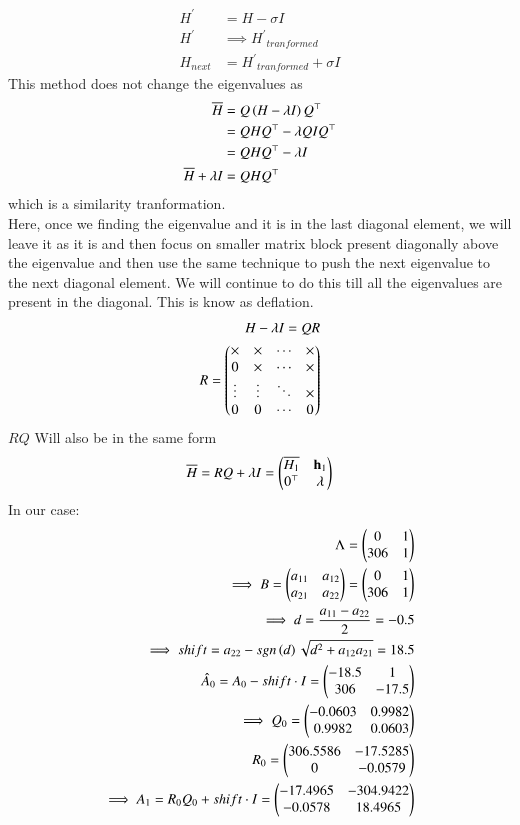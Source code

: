 \documentclass[journal]{IEEEtran}
\begin{document}
\begin{align}
	H^\prime &= H - \sigma I\\
	H^\prime &\implies {H^\prime}_{tranformed}\\
	H_{next} &= {H^\prime}_{tranformed} + \sigma I
\end{align}
This method does not change the eigenvalues as
\begin{align}
\overline{H} &= Q\left(H - \lambda I\right)Q^\top\\
	&= QHQ^\top - \lambda QIQ^\top\\
	&= QHQ^\top - \lambda I\\
\overline{H} +\lambda I &= QHQ^\top
\end{align}
which is a similarity tranformation.\\
Here, once we finding the eigenvalue and it is in the last diagonal element, we will leave it as it is and then focus on smaller matrix block present diagonally above the eigenvalue and then use the same technique to push the next eigenvalue to the next diagonal element. We will continue to do this till all the eigenvalues are present in the diagonal. This is know as deflation.
\begin{align}
H  - \lambda I = QR\\
R = \begin{pmatrix}\times & \times & \cdots & \times\\
	0 & \times & \cdots & \times\\
	\vdots & \vdots & \ddots & \times\\
	0 & 0 & \cdots & 0\end{pmatrix}
\end{align}
$RQ$ Will also be in the same form
\begin{align}
\overline{H} = RQ+\lambda I = \begin{pmatrix}\overline{H_1} & \mathbf{h}_1\\0^\top & \lambda\end{pmatrix}
\end{align}
In our case:
\begin{align}
    \Lambda=\begin{pmatrix}0&1\\306&1\end{pmatrix}\\
    \implies B=\begin{pmatrix}a_{11}&a_{12}\\a_{21}&a_{22}\end{pmatrix}=\begin{pmatrix}0&1\\306&1\end{pmatrix}\\
    \implies d=\frac{a_{11}-a_{22}}{2}=-0.5\\
\implies shift=a_{22}-sgn\left(d\right)\sqrt{d^2+a_{12}a_{21}}=18.5\\
    \hat{A}_0=A_0-shift\cdot I=\begin{pmatrix}-18.5&1\\306&-17.5\end{pmatrix}\\
    \implies Q_0=\begin{pmatrix}-0.0603&0.9982\\0.9982&0.0603\end{pmatrix}\\R_0=\begin{pmatrix}306.5586&-17.5285\\0&-0.0579\end{pmatrix}\\
    \implies A_1=R_0Q_0+shift\cdot I=\begin{pmatrix}-17.4965&-304.9422\\-0.0578&18.4965\end{pmatrix}
\end{align}
\end{document}
